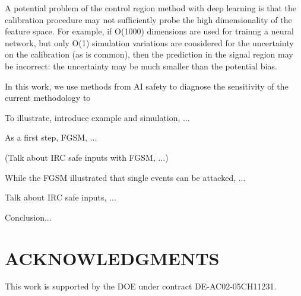 \documentclass[reprint,nofootinbib,...]{revtex4-1}
\begin{document}
A potential problem of the control region method with deep learning is that the calibration procedure may not sufficiently probe the high dimensionality of the feature space.  For example, if O(1000) dimensions are used for trainng a neural network, but only O(1) simulation variations are considered for the uncertainty on the calibration (as is common), then the prediction in the signal region may be incorrect: the uncertainty may be much smaller than the potential bias.

In this work, we use methods from AI safety to diagnose the sensitivity of the current methodology to 

To illustrate, introduce example and simulation, ...

As a first step, FGSM, ...

(Talk about IRC safe inputs with FGSM, ...)

While the FGSM illustrated that single events can be attacked, ...

Talk about IRC safe inputs, ...

Conclusion...


\section*{ACKNOWLEDGMENTS}

This work is supported by the DOE under contract DE-AC02-05CH11231. 


\end{document}

